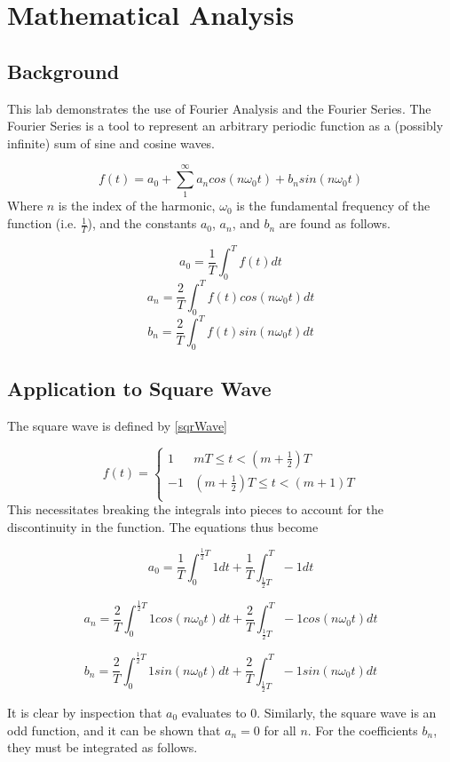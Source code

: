 \documentclass[main.tex]{subfile}
\begin{document}
	\section{Mathematical Analysis}
	\subsection{Background}
	This lab demonstrates the use of Fourier Analysis and the Fourier Series. The
	Fourier Series is a tool to represent an arbitrary periodic function as a
	(possibly infinite) sum of sine and cosine waves.
	
	$$f(t) = a_0 + \sum_{1}^{\infty} a_n cos(n \omega_0 t) + b_n sin(n \omega_0 t)$$ 
	Where $n$ is the index of the harmonic, $\omega_0$ is the fundamental
	frequency of the function (i.e. $\frac{1}{T}$), and the constants $a_0$,
	$a_n$, and $b_n$ are found as follows.
	
	$$a_0 = \frac{1}{T} \int_{0}^{T}f(t)dt$$
	$$a_n = \frac{2}{T} \int_{0}^{T}f(t) cos(n \omega_0 t)dt$$
	$$b_n = \frac{2}{T} \int_{0}^{T}f(t) sin(n \omega_0 t)dt$$

	\subsection{Application to Square Wave}
	The square wave is defined by \eqref{sqrWave}

	\[ f(t) =  \begin{cases}
	1 & mT \leq t < (m + \frac{1}{2})T \\
	-1 & (m + \frac{1}{2})T \leq t < (m + 1)T \\
	\end{cases} \label{eq:sqrWave}
	\]
	This necessitates breaking the integrals into pieces to account for the
	discontinuity in the function. The equations thus become
	
	$$a_0 = \frac{1}{T} \int_{0}^{\frac{1}{2}T}1dt + \frac{1}{T} \int_{\frac{1}{2}T}^{T} -1dt$$ 
	
	$$a_n = \frac{2}{T} \int_{0}^{\frac{1}{2}T}1cos(n \omega_0 t)dt + \frac{2}{T} \int_{\frac{1}{2}T}^{T}-1cos(n \omega_0 t)dt $$
	
	$$b_n = \frac{2}{T} \int_{0}^{\frac{1}{2}T}1sin(n \omega_0 t)dt + \frac{2}{T} \int_{\frac{1}{2}T}^{T} -1sin(n \omega_0 t)dt $$
	
	It is clear by inspection that $a_0$ evaluates to 0. Similarly, the square
	wave is an odd function, and it can be shown that $a_n = 0$ for all $n$. For the coefficients $b_n$, they must be integrated as follows. 
	
\end{document}
